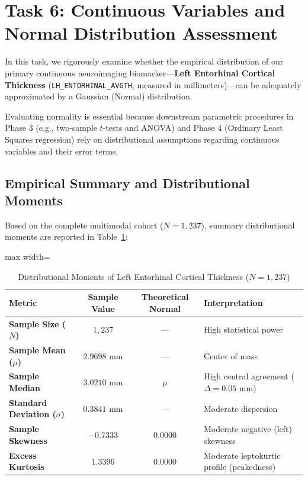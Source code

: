 \documentclass[11pt, a4paper]{article}
\begin{document}
\section{Task 6: Continuous Variables and Normal Distribution Assessment}
In this task, we rigorously examine whether the empirical distribution of our primary continuous neuroimaging biomarker---\textbf{Left Entorhinal Cortical Thickness} (\texttt{LH\_ENTORHINAL\_AVGTH}, measured in millimeters)---can be adequately approximated by a Gaussian (Normal) distribution.

Evaluating normality is essential because downstream parametric procedures in Phase 3 (e.g., two-sample $t$-tests and ANOVA) and Phase 4 (Ordinary Least Squares regression) rely on distributional assumptions regarding continuous variables and their error terms.

\subsection{Empirical Summary and Distributional Moments}
Based on the complete multimodal cohort ($N = 1,237$), summary distributional moments are reported in Table~\ref{tab:task6_normality}:

\begin{table}[H]
\centering
\caption{Distributional Moments of Left Entorhinal Cortical Thickness ($N = 1,237$)}
\label{tab:task6_normality}
\begin{adjustbox}{max width=\textwidth}
\small
\begin{tabular}{lccl}
\toprule
\textbf{Metric} & \textbf{Sample Value} & \textbf{Theoretical Normal} & \textbf{Interpretation} \\
\midrule
\textbf{Sample Size ($N$)} & $1,237$ & --- & High statistical power \\
\textbf{Sample Mean ($\mu$)} & $2.9698\text{ mm}$ & --- & Center of mass \\
\textbf{Sample Median} & $3.0210\text{ mm}$ & $\mu$ & High central agreement ($\Delta = 0.05\text{ mm}$) \\
\textbf{Standard Deviation ($\sigma$)} & $0.3841\text{ mm}$ & --- & Moderate dispersion \\
\textbf{Sample Skewness} & $-0.7333$ & $0.0000$ & Moderate negative (left) skewness \\
\textbf{Excess Kurtosis} & $1.3396$ & $0.0000$ & Moderate leptokurtic profile (peakedness) \\
\bottomrule
\end{tabular}
\end{adjustbox}
\end{table}
\end{document}
